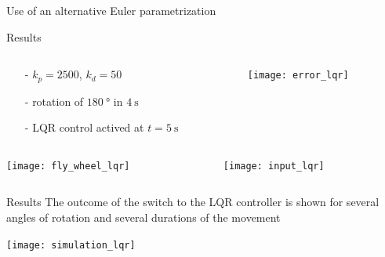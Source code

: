 \begin{frame}{Use of an alternative Euler parametrization}
\end{frame}

\begin{frame}{Results}
  \vskip0.1in
  \begin{columns}
    \begin{column}{0.45\textwidth}
      \begin{itemize}
      \item[-]$k_p = 2500$, $k_d = 50$
      \item[-]rotation of $\SI{180}{\degree}$ in $\SI{4}{\second}$
      \item[-]LQR control actived at $t = \SI{5}{\second}$ 
      \end{itemize}
    \end{column}
    \begin{column}{0.45\textwidth}
      \texttt{[image: error\_lqr]}
    \end{column}
  \end{columns}
  \begin{columns}
    \begin{column}{0.45\textwidth}
      \texttt{[image: fly\_wheel\_lqr]}
    \end{column}
    \begin{column}{0.45\textwidth}
      \texttt{[image: input\_lqr]}
    \end{column}
  \end{columns}
\end{frame}



\begin{frame}{Results}
  The outcome of the switch to the LQR controller
  is shown for several angles of rotation and several durations of the movement
  \par
  \centering
  \texttt{[image: simulation\_lqr]}
\end{frame}

